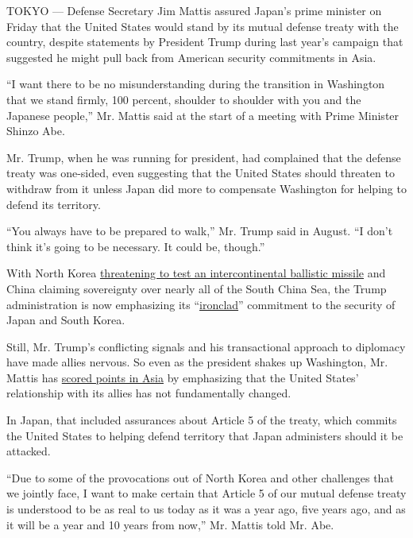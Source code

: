 TOKYO --- Defense Secretary Jim Mattis assured Japan's prime minister on
Friday that the United States would stand by its mutual defense treaty
with the country, despite statements by President Trump during last
year's campaign that suggested he might pull back from American security
commitments in Asia.

``I want there to be no misunderstanding during the transition in
Washington that we stand firmly, 100 percent, shoulder to shoulder with
you and the Japanese people,'' Mr. Mattis said at the start of a meeting
with Prime Minister Shinzo Abe.

Mr. Trump, when he was running for president, had complained that the
defense treaty was one-sided, even suggesting that the United States
should threaten to withdraw from it unless Japan did more to compensate
Washington for helping to defend its territory.

``You always have to be prepared to walk,'' Mr. Trump said in August.
``I don't think it's going to be necessary. It could be, though.''

With North Korea
\href{https://www.nytimes3xbfgragh.onion/2017/01/01/world/asia/north-korea-intercontinental-ballistic-missile-test-kim-jong-un.html}{threatening
to test an intercontinental ballistic missile} and China claiming
sovereignty over nearly all of the South China Sea, the Trump
administration is now emphasizing its
``\href{https://www.nytimes3xbfgragh.onion/reuters/2017/01/28/world/asia/28reuters-usa-trump-japan-whitehouse.html}{ironclad}''
commitment to the security of Japan and South Korea.

Still, Mr. Trump's conflicting signals and his transactional approach to
diplomacy have made allies nervous. So even as the president shakes up
Washington, Mr. Mattis has
\href{https://www.nytimes3xbfgragh.onion/2017/02/02/world/asia/james-mattis-us-korea-thaad.html}{scored
points in Asia} by emphasizing that the United States' relationship with
its allies has not fundamentally changed.

In Japan, that included assurances about Article 5 of the treaty, which
commits the United States to helping defend territory that Japan
administers should it be attacked.

``Due to some of the provocations out of North Korea and other
challenges that we jointly face, I want to make certain that Article 5
of our mutual defense treaty is understood to be as real to us today as
it was a year ago, five years ago, and as it will be a year and 10 years
from now,'' Mr. Mattis told Mr. Abe.

